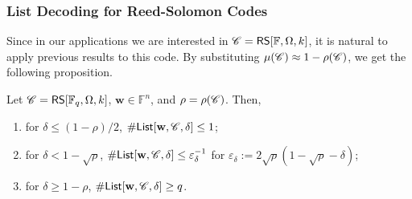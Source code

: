 \documentclass[../../book]{subfiles}
\begin{document}
\subsubsection{List Decoding for Reed-Solomon Codes}

Since in our applications we are interested in $\mathscr{C} = \mathsf{RS}[\mathbb{F},\Omega,k]$, it is natural to apply previous results to this code.
By substituting $\mu(\mathscr{C}) \approx 1-\rho(\mathscr{C})$, we get the following proposition.
\begin{proposition}
  Let $\mathscr{C} = \mathsf{RS}[\mathbb{F}_q,\Omega,k]$, $\mathbf{w} \in \mathbb{F}^n$, and $\rho = \rho(\mathscr{C})$. Then,
  \begin{enumerate}
    \item for $\delta \leq (1-\rho)/2$, $\#\mathsf{List}[\mathbf{w},\mathscr{C},\delta] \leq 1$;
    \item for $\delta < 1-\sqrt{\rho}$, $\#\mathsf{List}[\mathbf{w},\mathscr{C},\delta] \leq \varepsilon_{\delta}^{-1}$ for $\varepsilon_{\delta} := 2\sqrt{\rho}(1-\sqrt{\rho}-\delta)$;
    \item for $\delta \geq 1-\rho$, $\#\mathsf{List}[\mathbf{w},\mathscr{C},\delta] \geq q$.
  \end{enumerate}
\end{proposition}
\end{document}
